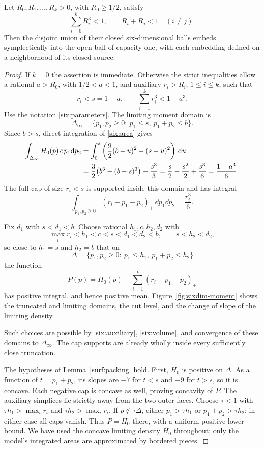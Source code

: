 \begin{proposition}\label{six:large}
Let \(R_0,R_1,\ldots,R_k>0\), with \(R_0\ge1/2\), satisfy
\[
 \sum_{i=0}^k R_i^3<1,\qquad
 R_i+R_j<1\quad(i\ne j).
\]
Then the disjoint union of their closed six-dimensional
balls embeds symplectically into the open ball of capacity
one, with each embedding defined on a neighborhood of its
closed source.
\end{proposition}

\begin{proof}
If \(k=0\) the assertion is immediate.  Otherwise the
strict inequalities allow a rational \(a>R_0\), with
\(1/2<a<1\), and auxiliary \(r_i>R_i\), \(1\le i\le k\),
such that
\begin{equation}\label{six:auxiliary}
 r_i<s=1-a,\qquad
 \sum_{i=1}^k r_i^3<1-a^3.
\end{equation}
Use the notation \eqref{six:parameters}.
The limiting moment domain is
\[
 \Delta_\infty=
 \{p_1,p_2\ge0:\ p_1\le s,\ p_1+p_2\le b\}.
\]
Since \(b>s\), direct integration of \eqref{six:area} gives
\begin{align}
 \int_{\Delta_\infty}H_0(p)\,\mathrm d p_1\mathrm d p_2
 &=\int_0^s
       \left(\frac92(b-u)^2-(s-u)^2\right)\,\mathrm d u
       \label{six:volume}\\
 &=\frac32\bigl(b^3-(b-s)^3\bigr)-\frac{s^3}{3}
   =\frac{s}{2}-\frac{s^2}{2}+\frac{s^3}{6}
   =\frac{1-a^3}{6}.\notag
\end{align}
The full cap of size \(r_i<s\) is supported inside this
domain and has integral
\[
 \int_{p_1,p_2\ge0}(r_i-p_1-p_2)_+\,
                 \dd p_1\dd p_2=\frac{r_i^3}{6}.
\]

Fix \(d_1\) with \(s<d_1<b\).  Choose rational \(h_1,c,h_2,d_2\)
with
\begin{equation}\label{six:truncation}
 \max_i r_i<h_1<c<s<d_1<d_2<b,\qquad
 s<h_2<d_2,
\end{equation}
so close to \(h_1=s\) and \(h_2=b\) that on
\[
 \Delta=\{p_1,p_2\ge0:\ p_1\le h_1,\ p_1+p_2\le h_2\}
\]
the function
\[
 P(p)=H_0(p)-\sum_{i=1}^k(r_i-p_1-p_2)_+
\]
has positive integral, and hence positive mean.
Figure~\ref{fig:sixdim-moment} shows the truncated and limiting
domains, the cut level, and the change of slope of the limiting density.

Such choices are possible by \eqref{six:auxiliary},
\eqref{six:volume}, and convergence of these domains to
\(\Delta_\infty\).  The cap supports are already wholly
inside every sufficiently close truncation.

The hypotheses of Lemma~\ref{surf:packing} hold.
First, \(H_0\) is positive on \(\Delta\).
As a function of \(t=p_1+p_2\), its slopes are \(-7\)
for \(t<s\) and \(-9\) for \(t>s\), so it is concave.
Each negative cap is concave as well, proving concavity
of \(P\).
The auxiliary simplices lie strictly away from the two
outer faces.  Choose \(\tau<1\) with
\(\tau h_1>\max_i r_i\) and \(\tau h_2>\max_i r_i\).
If \(p\notin\tau\Delta\), either
\(p_1>\tau h_1\) or \(p_1+p_2>\tau h_2\); in either case
all caps vanish.  Thus \(P=H_0\) there, with a uniform
positive lower bound.  We have used the concave limiting
density \(H_0\) throughout; only the model's integrated
areas are approximated by bordered pieces.


\end{proof}
